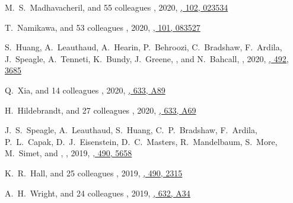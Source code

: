 \begin{etaremune}
\item
M.~S.~Madhavacheril, and 55 colleagues
,
2020, \href{https://ui.adsabs.harvard.edu/abs/2020PhRvD.102b3534M}{\prd, 102, 023534}

\item
T.~Namikawa, and 53 colleagues
,
2020, \href{https://ui.adsabs.harvard.edu/abs/2020PhRvD.101h3527N}{\prd, 101, 083527}

\item
S.~Huang, A.~Leauthaud, A.~Hearin, P.~Behroozi, C.~Bradshaw, F.~Ardila, J.~Speagle, A.~Tenneti, K.~Bundy, J.~Greene, \myself, and N.~Bahcall,
,
2020, \href{https://ui.adsabs.harvard.edu/abs/2020MNRAS.492.3685H}{\mnras, 492, 3685}

\item
Q.~Xia, and 14 colleagues
,
2020, \href{https://ui.adsabs.harvard.edu/abs/2020A&A...633A..89X}{\aap, 633, A89}

\item
H.~Hildebrandt, and 27 colleagues
,
2020, \href{https://ui.adsabs.harvard.edu/abs/2020A&A...633A..69H}{\aap, 633, A69}

\item
J.~S.~Speagle, A.~Leauthaud, S.~Huang, C.~P.~Bradshaw, F.~Ardila, P.~L.~Capak, D.~J.~Eisenstein, D.~C.~Masters, R.~Mandelbaum, S.~More, M.~Simet, and \myself,
,
2019, \href{https://ui.adsabs.harvard.edu/abs/2019MNRAS.490.5658S}{\mnras, 490, 5658}

\item
K.~R.~Hall, and 25 colleagues
,
2019, \href{https://ui.adsabs.harvard.edu/abs/2019MNRAS.490.2315H}{\mnras, 490, 2315}

\item
A.~H.~Wright, and 24 colleagues
,
2019, \href{https://ui.adsabs.harvard.edu/abs/2019A&A...632A..34W}{\aap, 632, A34}


\end{etaremune}
